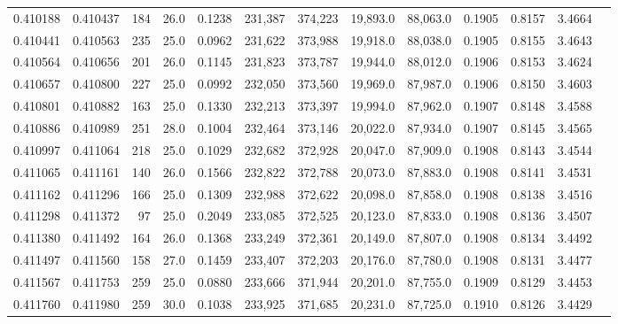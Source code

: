 \begin{tabular}{rrrrrrrrrrrrr}
0.410188 & 0.410437 &   184 & 26.0 &                                     0.1238 & 231,387 & 374,223 &  19,893.0 &  88,063.0 & 0.1905 & 0.8157 & 3.4664 \\
0.410441 & 0.410563 &   235 & 25.0 &                                     0.0962 & 231,622 & 373,988 &  19,918.0 &  88,038.0 & 0.1905 & 0.8155 & 3.4643 \\
0.410564 & 0.410656 &   201 & 26.0 &                                     0.1145 & 231,823 & 373,787 &  19,944.0 &  88,012.0 & 0.1906 & 0.8153 & 3.4624 \\
0.410657 & 0.410800 &   227 & 25.0 &                                     0.0992 & 232,050 & 373,560 &  19,969.0 &  87,987.0 & 0.1906 & 0.8150 & 3.4603 \\
0.410801 & 0.410882 &   163 & 25.0 &                                     0.1330 & 232,213 & 373,397 &  19,994.0 &  87,962.0 & 0.1907 & 0.8148 & 3.4588 \\
0.410886 & 0.410989 &   251 & 28.0 &                                     0.1004 & 232,464 & 373,146 &  20,022.0 &  87,934.0 & 0.1907 & 0.8145 & 3.4565 \\
0.410997 & 0.411064 &   218 & 25.0 &                                     0.1029 & 232,682 & 372,928 &  20,047.0 &  87,909.0 & 0.1908 & 0.8143 & 3.4544 \\
0.411065 & 0.411161 &   140 & 26.0 &                                     0.1566 & 232,822 & 372,788 &  20,073.0 &  87,883.0 & 0.1908 & 0.8141 & 3.4531 \\
0.411162 & 0.411296 &   166 & 25.0 &                                     0.1309 & 232,988 & 372,622 &  20,098.0 &  87,858.0 & 0.1908 & 0.8138 & 3.4516 \\
0.411298 & 0.411372 &    97 & 25.0 &                                     0.2049 & 233,085 & 372,525 &  20,123.0 &  87,833.0 & 0.1908 & 0.8136 & 3.4507 \\
0.411380 & 0.411492 &   164 & 26.0 &                                     0.1368 & 233,249 & 372,361 &  20,149.0 &  87,807.0 & 0.1908 & 0.8134 & 3.4492 \\
0.411497 & 0.411560 &   158 & 27.0 &                                     0.1459 & 233,407 & 372,203 &  20,176.0 &  87,780.0 & 0.1908 & 0.8131 & 3.4477 \\
0.411567 & 0.411753 &   259 & 25.0 &                                     0.0880 & 233,666 & 371,944 &  20,201.0 &  87,755.0 & 0.1909 & 0.8129 & 3.4453 \\
0.411760 & 0.411980 &   259 & 30.0 &                                     0.1038 & 233,925 & 371,685 &  20,231.0 &  87,725.0 & 0.1910 & 0.8126 & 3.4429 \\

\end{tabular}
